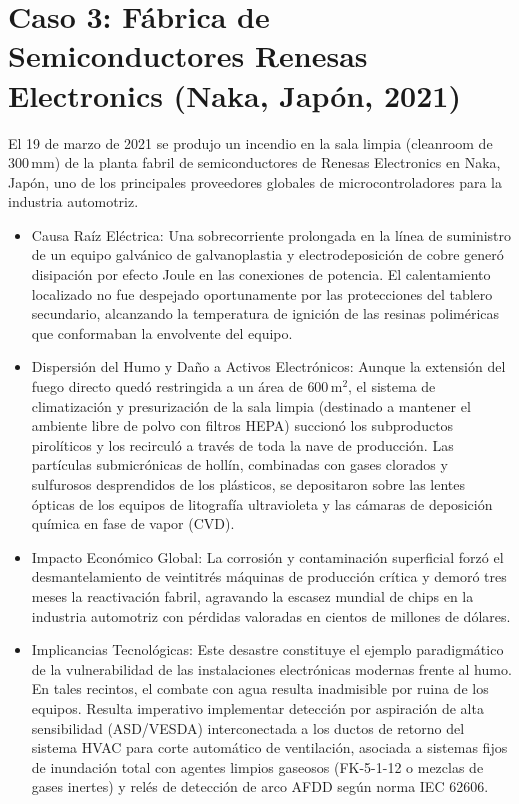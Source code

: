 \section{Caso 3: Fábrica de Semiconductores Renesas Electronics (Naka, Japón, 2021)}
\label{sec.cap8:renesas_cleanroom}

El 19 de marzo de 2021 se produjo un incendio en la sala limpia (cleanroom de $300\,\mathrm{mm}$) de la planta fabril de
semiconductores de Renesas Electronics en Naka, Japón, uno de los principales proveedores globales de microcontroladores
para la industria automotriz.

\begin{itemize}
    \item Causa Raíz Eléctrica: Una sobrecorriente prolongada en la línea de suministro de un equipo galvánico de
          galvanoplastia y electrodeposición de cobre generó disipación por efecto Joule en las conexiones de potencia. El
          calentamiento localizado no fue despejado oportunamente por las protecciones del tablero secundario, alcanzando
          la temperatura de ignición de las resinas poliméricas que conformaban la envolvente del equipo.
    \item Dispersión del Humo y Daño a Activos Electrónicos: Aunque la extensión del fuego directo quedó restringida a
          un área de $600\,\mathrm{m^2}$, el sistema de climatización y presurización de la sala limpia (destinado a mantener
          el ambiente libre de polvo con filtros HEPA) succionó los subproductos pirolíticos y los recirculó a través de
          toda la nave de producción. Las partículas submicrónicas de hollín, combinadas con gases clorados y sulfurosos
          desprendidos de los plásticos, se depositaron sobre las lentes ópticas de los equipos de litografía ultravioleta y
          las cámaras de deposición química en fase de vapor (CVD).
    \item Impacto Económico Global: La corrosión y contaminación superficial forzó el desmantelamiento de veintitrés
          máquinas de producción crítica y demoró tres meses la reactivación fabril, agravando la escasez mundial de chips
          en la industria automotriz con pérdidas valoradas en cientos de millones de dólares.
    \item Implicancias Tecnológicas: Este desastre constituye el ejemplo paradigmático de la vulnerabilidad de las
          instalaciones electrónicas modernas frente al humo. En tales recintos, el combate con agua resulta inadmisible por
          ruina de los equipos. Resulta imperativo implementar detección por aspiración de alta sensibilidad (ASD/VESDA)
          interconectada a los ductos de retorno del sistema HVAC para corte automático de ventilación, asociada a sistemas
          fijos de inundación total con agentes limpios gaseosos (FK-5-1-12 o mezclas de gases inertes) y relés de detección
          de arco AFDD según norma IEC 62606.
\end{itemize}

